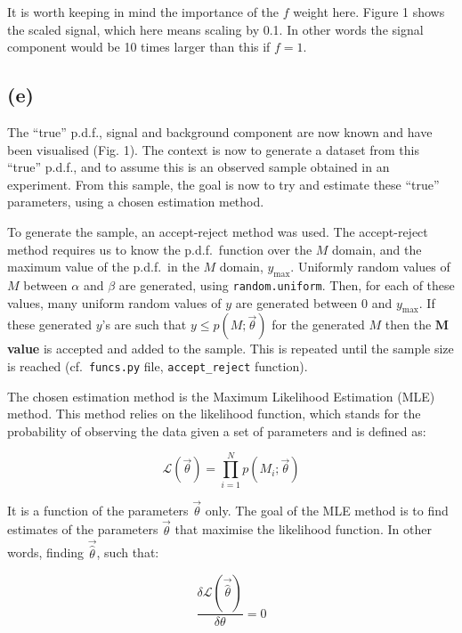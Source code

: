 \documentclass[12pt]{report} %
\begin{document}
It is worth keeping in mind the importance of the $f$ weight here. Figure 1 shows the scaled signal, which here means scaling by 0.1. In other words the signal component would be 10 times larger than this if $f=1$.

\subsection*{(e)}

The ``true'' p.d.f., signal and background component are now known and have been visualised (Fig. 1). The context is now to generate a dataset from this ``true'' p.d.f., and to assume this is an observed sample obtained in an experiment. From this sample, the goal is now to try and estimate these ``true'' parameters, using a chosen estimation method.  

To generate the sample, an accept-reject method was used\cite{wiki-rejection-sampling}. The accept-reject method requires us to know the p.d.f.\ function over the $M$ domain, and the maximum value of the p.d.f.\ in the $M$ domain, $y_{\max}$. Uniformly random values of $M$ between $\alpha$ and $\beta$ are generated, using \texttt{random.uniform}\cite{python-random}. Then, for each of these values, many uniform random values of $y$ are generated between 0 and $y_{\max}$. If these generated $y$'s are such that $y \leq p(M;\vec{\theta})$ for the generated $M$ then the \textbf{$\mathbf{M}$ value} is accepted and added to the sample. This is repeated until the sample size is reached (cf.\ \texttt{funcs.py} file, \texttt{accept\_reject} function).  

The chosen estimation method is the Maximum Likelihood Estimation (MLE) method\cite[pp. 122-128]{Wass}. This method relies on the likelihood function, which stands for the probability of observing the data given a set of parameters and is defined as:

\begin{equation}
    \mathcal{L}(\vec{\theta}) = \displaystyle \prod_{i=1}^{N} p(M_{i};\vec{\theta})
\end{equation}

It is a function of the parameters $\vec{\theta}$ only. The goal of the MLE method is to find estimates of the parameters $\vec{\theta}$ that maximise the likelihood function\cite[pp. 122-128]{Wass}. In other words, finding $\vec{\hat{\theta}}$, such that:  

\begin{equation}
    \frac{\delta\mathcal{L}(\vec{\hat{\theta}})}{\delta \theta} = 0
\end{equation}
\end{document}
